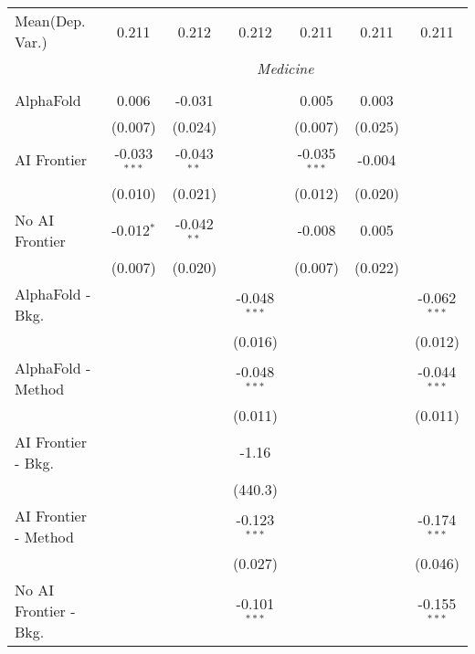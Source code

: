 \begin{tabular}{lcccccc}
Mean(Dep. Var.) & 0.211 & 0.212 & 0.212 & 0.211 & 0.211 & 0.211 \\
 & \multicolumn{6}{c}{\textit{Medicine}} \\ \\
   AlphaFold               & 0.006          & -0.031        &                & 0.005          & 0.003   &   \\   
                           & (0.007)        & (0.024)       &                & (0.007)        & (0.025) &   \\   
   AI Frontier             & -0.033$^{***}$ & -0.043$^{**}$ &                & -0.035$^{***}$ & -0.004  &   \\   
                           & (0.010)        & (0.021)       &                & (0.012)        & (0.020) &   \\   
   No AI Frontier          & -0.012$^{*}$   & -0.042$^{**}$ &                & -0.008         & 0.005   &   \\   
                           & (0.007)        & (0.020)       &                & (0.007)        & (0.022) &   \\   
   AlphaFold - Bkg.        &                &               & -0.048$^{***}$ &                &         & -0.062$^{***}$\\   
                           &                &               & (0.016)        &                &         & (0.012)\\   
   AlphaFold - Method      &                &               & -0.048$^{***}$ &                &         & -0.044$^{***}$\\   
                           &                &               & (0.011)        &                &         & (0.011)\\   
   AI Frontier - Bkg.      &                &               & -1.16          &                &         &   \\   
                           &                &               & (440.3)        &                &         &   \\   
   AI Frontier - Method    &                &               & -0.123$^{***}$ &                &         & -0.174$^{***}$\\   
                           &                &               & (0.027)        &                &         & (0.046)\\   
   No AI Frontier - Bkg.   &                &               & -0.101$^{***}$ &                &         & -0.155$^{***}$\\   

\end{tabular}
